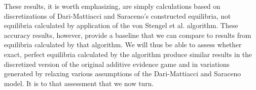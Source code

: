 \documentclass{article}
\begin{document}
These results, it is worth emphasizing, are simply calculations based on discretizations of Dari-Mattiacci and Saraceno's constructed equilibria, not equilibria calculated by application of the von Stengel et al. algorithm. These accuracy results, however, provide a baseline that we can compare to results from equilibria calculated by that algorithm. We will thus be able to assess whether exact, perfect equilibria calculated by the algorithm produce similar results in the discretized version of the original additive evidence game and in variations generated by relaxing various assumptions of the Dari-Mattiacci and Saraceno model. It is to that assessment that we now turn.

\printbibliography
\end{document}
